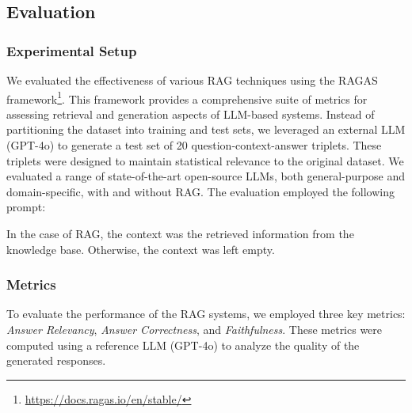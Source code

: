 \subsection{Evaluation}
\label{subsec:evaluation-rag}

\subsubsection{Experimental Setup}
We evaluated the effectiveness of various \gls{RAG} techniques using the RAGAS framework\footnote{\url{https://docs.ragas.io/en/stable/}}.
%
This framework provides a comprehensive suite of metrics for assessing retrieval and generation aspects of \gls{LLM}-based systems.
%
Instead of partitioning the dataset into training and test sets, we leveraged an external \gls{LLM} (GPT-4o) to generate a test set of 20 question-context-answer triplets.
%
These triplets were designed to maintain statistical relevance to the original dataset.
%
We evaluated a range of state-of-the-art open-source \glspl{LLM}, both general-purpose and domain-specific, with and without \gls{RAG}.
%
The evaluation employed the following prompt:
%
\begin{center}
\end{center}
%
In the case of \gls{RAG}, the context was the retrieved information from the knowledge base.
%
Otherwise, the context was left empty.


\subsubsection{Metrics}
To evaluate the performance of the \gls{RAG} systems, we employed three key metrics: \textit{Answer Relevancy}, \textit{Answer Correctness}, and \textit{Faithfulness}.
%
These metrics were computed using a reference \gls{LLM} (GPT-4o) to analyze the quality of the generated responses.

